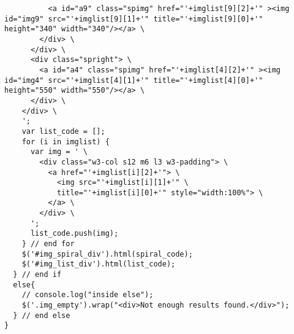 \begin{verbatim}
          <a id="a9" class="spimg" href="'+imglist[9][2]+'" ><img id="img9" src="'+imglist[9][1]+'" title="'+imglist[9][0]+'" height="340" width="340"/></a> \
        </div> \
      </div> \
      <div class="spright"> \
        <a id="a4" class="spimg" href="'+imglist[4][2]+'" ><img id="img4" src="'+imglist[4][1]+'" title="'+imglist[4][0]+'" height="550" width="550"/></a> \
      </div> \
    </div> \
    ';
    var list_code = [];
    for (i in imglist) {
      var img = ' \
        <div class="w3-col s12 m6 l3 w3-padding"> \
          <a href="'+imglist[i][2]+'"> \
            <img src="'+imglist[i][1]+'" \
            title="'+imglist[i][0]+'" style="width:100%"> \
          </a> \
        </div> \
      ';
      list_code.push(img);
    } // end for
    $('#img_spiral_div').html(spiral_code);
    $('#img_list_div').html(list_code);
  } // end if
  else{
    // console.log("inside else");
    $('.img_empty').wrap("<div>Not enough results found.</div>");
  } // end else
}
\end{verbatim}
